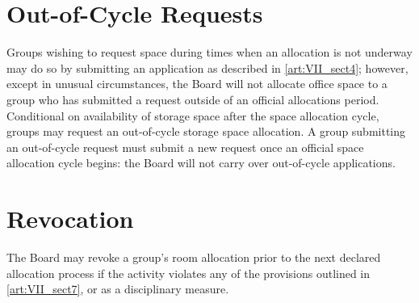 \documentclass[12pt]{article}
\begin{document}
\section{Out-of-Cycle Requests}
Groups wishing to request space during times when an allocation is not underway may do so by
submitting an application as described in \ref{art:VII_sect4}; however, except in unusual circumstances, the
Board will not allocate office space to a group who has submitted a request outside of an official
allocations period. Conditional on availability of storage space after the space allocation cycle, groups
may request an out-of-cycle storage space allocation. A group submitting an out-of-cycle request
must submit a new request once an official space allocation cycle begins: the Board will not carry
over out-of-cycle applications.

\section{Revocation}
The Board may revoke a group’s room allocation prior to the next declared allocation process if the
activity violates any of the provisions outlined in \ref{art:VII_sect7}, or as a disciplinary measure.
\end{document}
